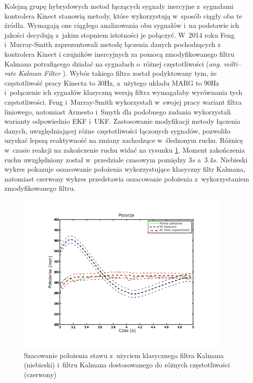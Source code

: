 Kolejną grupę hybrydowych metod łączących sygnały inercyjne z~sygnałami kontrolera Kinect stanowią metody, które wykorzystują w~sposób ciągły oba te źródła. Wymagają one ciągłego analizowania obu sygnałów i~na podstawie ich jakości decydują z~jakim stopniem istotności je połączyć. W~2014 roku Feng i~Murray-Smith \cite{Murray-Smith2014} zaprezentowali metodę łączenia danych pochodzących z kontrolera Kinect i czujników inercyjnych za pomocą zmodyfikowanego filtru Kalmana potrafiącego działać na sygnałach o~różnej częstotliwości (\emph{ang. milti--rate Kalman Filter} \cite{Dhuli2009}). Wybór takiego filtra został podyktowany tym, że częstotliwość pracy Kinecta to 30Hz, a~użytego układu MARG to 90Hz i~połączenie ich sygnałów klasyczną wersją filtra wymagałaby wyrównania tych częstotliwości. Feng i~Murray-Smith wykorzystali w~swojej pracy wariant filtra liniowego, natomiast Armesto i~Smyth dla podobnego zadania wykorzystali warianty odpowiednio EKF\cite{Armesto01062007} i~UKF\cite{Smyth2007}. Zastosowanie modyfikacji metody łączenia danych, uwzględniającej różne częstotliwości łączonych sygnałów, pozwoliło uzyskać lepszą reaktywność na zmiany zachodzące w~śledzonym ruchu. Różnicę w~czasie reakcji na zakończenie ruchu widać na rysunku \ref{fig:literature:feng}. Moment zakończenia ruchu uwzględniony został w~przedziale czasowym pomiędzy $3s$ a~$3.4s$. Niebieski wykres pokazuje oszacowanie położenia wykorzystujące klasyczny filtr Kalmana, natomiast czerwony wykres przedstawia oszacowanie położenia z~wykorzystaniem zmodyfikowanego filtru.
																																																	
\begin{savenotes}
	\begin{figure}[!htb]
		\centering 
		\includegraphics[width=0.95\textwidth]{images/Fig03.png}	
		\caption[Szacowanie położenia stawu z~użyciem klasycznego filtra Kalmana i~filtru Kalmana dostosowanego do różnych częstotliwości]{Szacowanie położenia stawu z~użyciem klasycznego filtra Kalmana (niebieski) i~filtru Kalmana dostosowanego do różnych częstotliwości (czerwony) \cite{Murray-Smith2014}}
		\label{fig:literature:feng}
	\end{figure}
\end{savenotes}
																																																			
